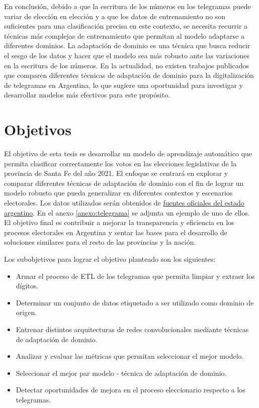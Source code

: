 En conclusión, debido a que la escritura de los números en los telegramas puede variar de elección en elección y a que
los datos de entrenamiento no son suficientes para una clasificación precisa en este contexto, se necesita recurrir a
técnicas más complejas de entrenamiento que permitan al modelo adaptarse a diferentes dominios. La adaptación de
dominio es una técnica que busca reducir el sesgo de los datos y hacer que el modelo sea más robusto ante las
variaciones en la escritura de los números. En la actualidad, no existen trabajos publicados que comparen diferentes
técnicas de adaptación de dominio para la digitalización de telegramas en Argentina, lo que sugiere una oportunidad
para investigar y desarrollar modelos más efectivos para este propósito.

\section{Objetivos}

El objetivo de esta tesis es desarrollar un modelo de aprendizaje automático que permita clasificar correctamente los
votos en las elecciones legislativas de la provincia de Santa Fe del año 2021. El enfoque se centrará en explorar y
comparar diferentes técnicas de adaptación de dominio con el fin de lograr un modelo robusto que pueda generalizar en
diferentes contextos y escenarios electorales. Los datos utilizados serán obtenidos de
\href{https://op.elecciones.gob.ar/telegramas/generales2021/}{fuentes oficiales del estado argentino}. En el anexo
\ref{anexo:telegrama} se adjunta un ejemplo de uno de ellos. El objetivo final es contribuir a mejorar la transparencia
y eficiencia en los procesos electorales en Argentina y sentar las bases para el desarrollo de soluciones similares
para el resto de las provincias y la nación.

Los subobjetivos para lograr el objetivo planteado son los siguientes:

\begin{itemize}
    \item Armar el proceso de ETL de los telegramas que permita limpiar y extraer los dígitos.
    \item Determinar un conjunto de datos etiquetado a ser utilizado como dominio de origen.
    \item Entrenar distintos arquitecturas de redes convolucionales mediante técnicas de adaptación de dominio.
    \item Analizar y evaluar las métricas que permitan seleccionar el mejor modelo.
    \item Seleccionar el mejor par modelo - técnica de adaptación de dominio.
    \item Detectar oportunidades de mejora en el proceso eleccionario respecto a los telegramas.
\end{itemize}

